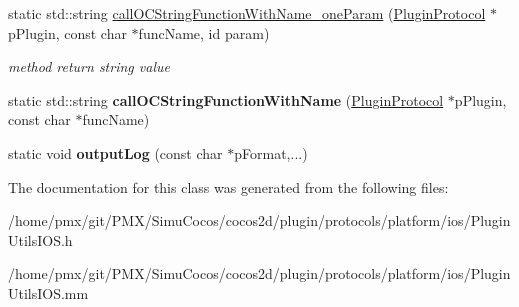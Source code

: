 \begin{DoxyCompactItemize}
\item 
\mbox{\label{classcocos2d_1_1plugin_1_1PluginUtilsIOS_a9a1f8c64da4f0b71db188a1e0d20391b}} 
static std\+::string \hyperlink{classcocos2d_1_1plugin_1_1PluginUtilsIOS_a9a1f8c64da4f0b71db188a1e0d20391b}{call\+O\+C\+String\+Function\+With\+Name\+\_\+one\+Param} (\hyperlink{classcocos2d_1_1plugin_1_1PluginProtocol}{Plugin\+Protocol} $\ast$p\+Plugin, const char $\ast$func\+Name, id param)
\begin{DoxyCompactList}\small\item\em method return string value \end{DoxyCompactList}\item 
\mbox{\label{classcocos2d_1_1plugin_1_1PluginUtilsIOS_ac5de4429c3a606c5db36bc62d31503bc}} 
static std\+::string {\bfseries call\+O\+C\+String\+Function\+With\+Name} (\hyperlink{classcocos2d_1_1plugin_1_1PluginProtocol}{Plugin\+Protocol} $\ast$p\+Plugin, const char $\ast$func\+Name)
\item 
\mbox{\label{classcocos2d_1_1plugin_1_1PluginUtilsIOS_a5e7c771625eae4324d81eb09f18a9975}} 
static void {\bfseries output\+Log} (const char $\ast$p\+Format,...)
\end{DoxyCompactItemize}


The documentation for this class was generated from the following files\+:\begin{DoxyCompactItemize}
\item 
/home/pmx/git/\+P\+M\+X/\+Simu\+Cocos/cocos2d/plugin/protocols/platform/ios/Plugin\+Utils\+I\+O\+S.\+h\item 
/home/pmx/git/\+P\+M\+X/\+Simu\+Cocos/cocos2d/plugin/protocols/platform/ios/Plugin\+Utils\+I\+O\+S.\+mm\end{DoxyCompactItemize}

